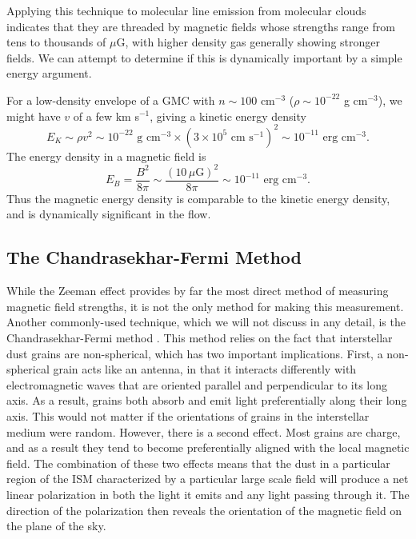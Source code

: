 Applying this technique to molecular line emission from molecular clouds indicates that they are threaded by magnetic fields whose strengths range from tens to thousands of $\mu$G, with higher density gas generally showing stronger fields. We can attempt to determine if this is dynamically important by a simple energy argument.

For a low-density envelope of a GMC with $n\sim 100$ cm$^{-3}$ ($\rho \sim 10^{-22}$ g cm$^{-3}$), we might have $v$ of a few km s$^{-1}$, giving a kinetic energy density
\begin{equation}
E_K \sim \rho v^2 \sim 10^{-22}\mbox{ g cm}^{-3} \times (3\times 10^5\mbox{ cm s}^{-1})^2\sim 10^{-11}\mbox{ erg cm}^{-3}.
\end{equation}
The energy density in a magnetic field is
\begin{equation}
E_B = \frac{B^2}{8\pi} \sim \frac{(10\,\mu\mbox{G})^2}{8\pi} \sim 10^{-11} \mbox{ erg cm}^{-3}.
\end{equation}
Thus the magnetic energy density is comparable to the kinetic energy density, and is dynamically significant in the flow.

\subsection{The Chandrasekhar-Fermi Method}

While the Zeeman effect provides by far the most direct method of measuring magnetic field strengths, it is not the only method for making this measurement. Another commonly-used technique, which we will not discuss in any detail, is the Chandrasekhar-Fermi method \citep{chandrasekhar53a}. This method relies on the fact that interstellar dust grains are non-spherical, which has two important implications. First, a non-spherical grain acts like an antenna, in that it interacts differently with electromagnetic waves that are oriented parallel and perpendicular to its long axis. As a result, grains both absorb and emit light preferentially along their long axis. This would not matter if the orientations of grains in the interstellar medium were random. However, there is a second effect. Most grains are charge, and as a result they tend to become preferentially aligned with the local magnetic field. The combination of these two effects means that the dust in a particular region of the ISM characterized by a particular large scale field will produce a net linear polarization in both the light it emits and any light passing through it. The direction of the polarization then reveals the orientation of the magnetic field on the plane of the sky.

